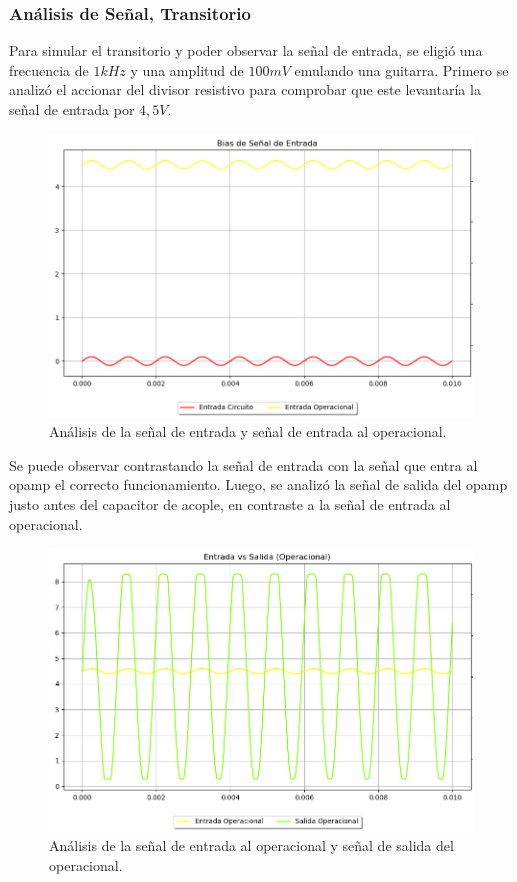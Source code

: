 \subsubsection{Análisis de Señal, Transitorio}

Para simular el transitorio y poder observar la señal de entrada, se eligió una frecuencia de $1kHz$ y una amplitud de $100mV$ emulando una guitarra.
Primero se analizó el accionar del divisor resistivo para comprobar que este levantaría la señal de entrada por $4,5V$.
\begin{figure}[H]
	\centering
	\includegraphics[width=1\textwidth, trim={0 0 0 0}, clip]{Ejercicio5/Imagenes/Circuito_base/Sim/circuito_base_tran_vi_viop.png}
	\caption{Análisis de la señal de entrada y señal de entrada al operacional.}
	\label{fig:sim_base}
\end{figure}
Se puede observar contrastando la señal de entrada con la señal que entra al opamp el correcto funcionamiento.
Luego, se analizó la señal de salida del opamp justo antes del capacitor de acople, en contraste a la señal de entrada al operacional.
\begin{figure}[H]
	\centering
	\includegraphics[width=1\textwidth, trim={0 0 0 0}, clip]{Ejercicio5/Imagenes/Circuito_base/Sim/circuito_base_tran_viop_voop.png}
	\caption{Análisis de la señal de entrada al operacional y señal de salida del operacional. }
	\label{fig:sim_base}
\end{figure}
